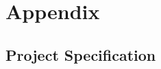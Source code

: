 \documentclass[titlepage, twocolumn, a4paper, 10pt]{article}
\begin{document}




%
%

\newpage
\onecolumn
\appendix
{}
\section{Appendix}\label{sec:app}
\subsection{Project Specification}\label{app:ps}
\newpage
\end{document}
